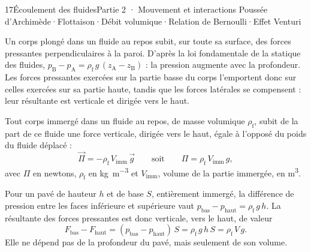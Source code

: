 \begin{ouverture}[fluides]{17}{Écoulement des fluides}{Partie 2 · Mouvement et interactions}
{Poussée d'Archimède\enspace·\enspace Flottaison\enspace·\enspace Débit volumique\enspace·\enspace Relation de Bernoulli\enspace·\enspace Effet Venturi}
\end{ouverture}
\essentiel
{}
\begin{propriete}
Un corps plongé dans un fluide au repos subit, sur toute sa surface, des forces pressantes perpendiculaires à la paroi.
D'après la loi fondamentale de la statique des fluides, $p_\mathrm{B}-p_\mathrm{A}=\rho_\mathrm{f}\,g\,(z_\mathrm{A}-z_\mathrm{B})$ :
la pression augmente avec la profondeur. Les forces pressantes exercées sur la partie basse du corps l'emportent donc sur
celles exercées sur sa partie haute, tandis que les forces latérales se compensent : leur résultante est verticale et
dirigée vers le haut.
\end{propriete}
\begin{loi}
Tout corps immergé dans un fluide au repos, de masse volumique $\rho_\mathrm{f}$, subit de la part de ce fluide une force
verticale, dirigée vers le haut, égale à l'opposé du poids du fluide déplacé :
\[\vec{\Pi}=-\rho_\mathrm{f}\,V_\mathrm{imm}\,\vec{g}\qquad\text{soit}\qquad \Pi=\rho_\mathrm{f}\,V_\mathrm{imm}\,g,\]
avec $\Pi$ en newtons, $\rho_\mathrm{f}$ en \unit{kg.m^{-3}} et $V_\mathrm{imm}$, volume de la partie immergée, en \unit{m^3}.
\end{loi}
\begin{savoirfaire}
Pour un pavé de hauteur $h$ et de base $S$, entièrement immergé, la différence de pression entre les faces inférieure
et supérieure vaut $p_\mathrm{bas}-p_\mathrm{haut}=\rho_\mathrm{f}\,g\,h$. La résultante des forces pressantes est donc
verticale, vers le haut, de valeur
\[F_\mathrm{bas}-F_\mathrm{haut}=(p_\mathrm{bas}-p_\mathrm{haut})\,S=\rho_\mathrm{f}\,g\,h\,S=\rho_\mathrm{f}\,V\,g.\]
Elle ne dépend pas de la profondeur du pavé, mais seulement de son volume.
\end{savoirfaire}
